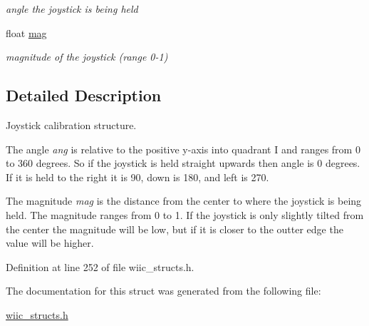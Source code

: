 \begin{DoxyCompactItemize}
\begin{DoxyCompactList}\small\item\em angle the joystick is being held \end{DoxyCompactList}\item 
\hypertarget{structjoystick__t_af358a1cfed3d18c4ce62fb62632b56cf}{float \hyperlink{structjoystick__t_af358a1cfed3d18c4ce62fb62632b56cf}{mag}}\label{structjoystick__t_af358a1cfed3d18c4ce62fb62632b56cf}

\begin{DoxyCompactList}\small\item\em magnitude of the joystick (range 0-\/1) \end{DoxyCompactList}\end{DoxyCompactItemize}


\subsection{Detailed Description}
Joystick calibration structure. 

The angle {\itshape ang} is relative to the positive y-\/axis into quadrant I and ranges from 0 to 360 degrees. So if the joystick is held straight upwards then angle is 0 degrees. If it is held to the right it is 90, down is 180, and left is 270.

The magnitude {\itshape mag} is the distance from the center to where the joystick is being held. The magnitude ranges from 0 to 1. If the joystick is only slightly tilted from the center the magnitude will be low, but if it is closer to the outter edge the value will be higher. 

Definition at line 252 of file wiic\-\_\-structs.\-h.



The documentation for this struct was generated from the following file\-:\begin{DoxyCompactItemize}
\item 
\hyperlink{wiic__structs_8h}{wiic\-\_\-structs.\-h}\end{DoxyCompactItemize}
